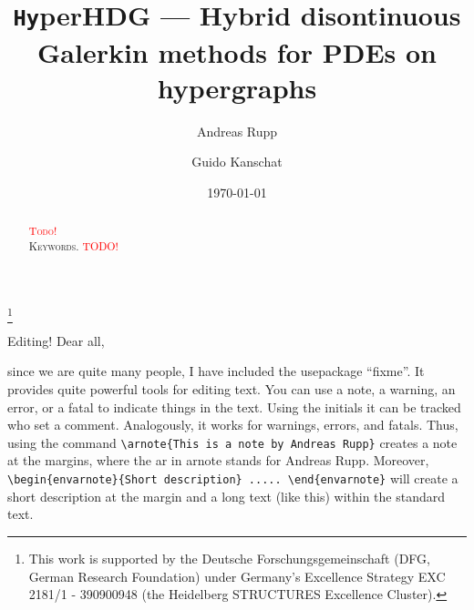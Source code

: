 \documentclass[a4paper, english, 12pt, reqno, draft]{amsart}
\theoremstyle{definition}
\theoremstyle{remark}
\numberwithin{equation}{section}
\newcommand{\hyperHDG}{{\fontfamily{pzc}\selectfont \texttt{Hy}\hspace{-1.5pt}perHDG }}
\begin{document}
\title[\hyperHDG --- HDG on hypergraphs]{\hyperHDG --- Hybrid disontinuous Galerkin methods for PDEs on hypergraphs} 

\author{Andreas Rupp}
\address{Interdisciplinary Center for Scientific Computing (IWR), Heidelberg University, Mathematikon, Im Neuenheimer Feld 205, 69120 Heidelberg, Germany}
\thanks{This work is supported by the Deutsche Forschungsgemeinschaft (DFG, German Research Foundation) under Germany's Excellence Strategy EXC 2181/1 - 390900948 (the Heidelberg STRUCTURES Excellence Cluster).}

\author{Guido Kanschat}
\address{Interdisciplinary Center for Scientific Computing (IWR) and Mathematics Center Heidelberg (MATCH), Heidelberg University, Mathematikon, Im Neuenheimer Feld 205, 69120 Heidelberg, Germany}

\subjclass[2010]{\textcolor{red}{TODO}}

\date{\today}


\begin{abstract}
 \textcolor{red}{\textsc{Todo!}} 
 \\[1ex] \noindent \textsc{Keywords.}
 \textcolor{red}{TODO!}
\end{abstract}
% 
\allowdisplaybreaks
\maketitle
% 

\begin{envarnote}{Editing!}
 Dear all,
 
 since we are quite many people, I have included the usepackage ``fixme''. It provides quite powerful tools for editing text. You can use a note, a warning, an error, or a fatal to indicate things in the text. Using the initials it can be tracked who set a comment. Analogously, it works for warnings, errors, and fatals. Thus, using the command \verb|\arnote{This is a note by Andreas Rupp}| creates a note at the margins, where the ar in arnote stands for Andreas Rupp. Moreover, \verb|\begin{envarnote}{Short description} ..... \end{envarnote}| \linebreak will create a short description at the margin and a long text (like this) within the standard text.
\end{envarnote}
% 
\end{document}
